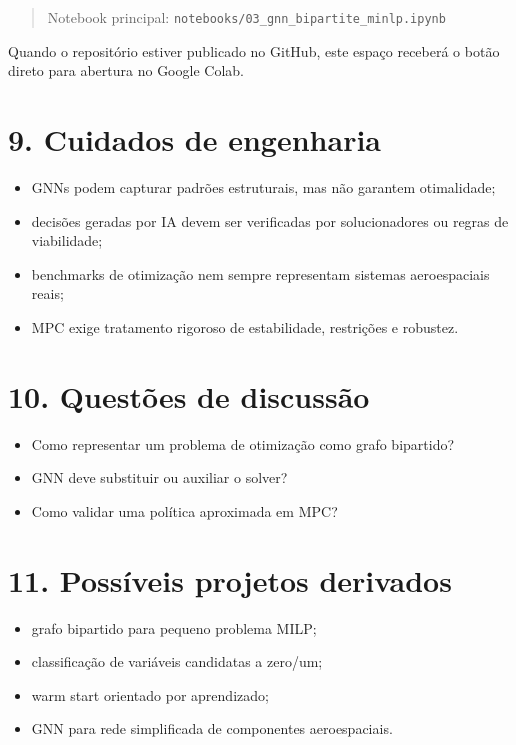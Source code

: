 \documentclass[
  brazilian,
  a4paper,
  DIV=11,
  numbers=noendperiod]{scrreprt}
\providecommand{\tightlist}{%
  \setlength{\itemsep}{0pt}\setlength{\parskip}{0pt}}
\begin{document}
\begin{quote}
Notebook principal: \texttt{notebooks/03\_gnn\_bipartite\_minlp.ipynb}
\end{quote}

Quando o repositório estiver publicado no GitHub, este espaço receberá o
botão direto para abertura no Google Colab.

\section{9. Cuidados de engenharia}\label{cuidados-de-engenharia-2}

\begin{itemize}
\tightlist
\item
  GNNs podem capturar padrões estruturais, mas não garantem otimalidade;
\item
  decisões geradas por IA devem ser verificadas por solucionadores ou
  regras de viabilidade;
\item
  benchmarks de otimização nem sempre representam sistemas aeroespaciais
  reais;
\item
  MPC exige tratamento rigoroso de estabilidade, restrições e robustez.
\end{itemize}

\section{10. Questões de discussão}\label{questuxf5es-de-discussuxe3o-2}

\begin{itemize}
\tightlist
\item
  Como representar um problema de otimização como grafo bipartido?
\item
  GNN deve substituir ou auxiliar o solver?
\item
  Como validar uma política aproximada em MPC?
\end{itemize}

\section{11. Possíveis projetos
derivados}\label{possuxedveis-projetos-derivados-2}

\begin{itemize}
\tightlist
\item
  grafo bipartido para pequeno problema MILP;
\item
  classificação de variáveis candidatas a zero/um;
\item
  warm start orientado por aprendizado;
\item
  GNN para rede simplificada de componentes aeroespaciais.
\end{itemize}
\end{document}
